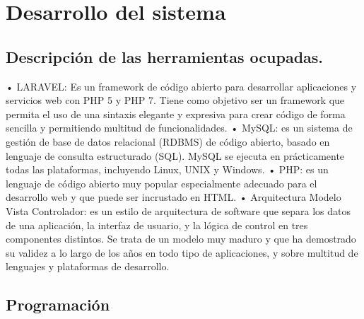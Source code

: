 \section{Desarrollo del sistema}
\subsection{Descripción de las herramientas ocupadas.}
•	LARAVEL: Es un framework de código abierto para desarrollar aplicaciones y servicios web con PHP 5 y PHP 7. Tiene como objetivo ser un framework que permita el uso de una sintaxis elegante y expresiva para crear código de forma sencilla y permitiendo multitud de funcionalidades.
•	MySQL: es un sistema de gestión de base de datos relacional (RDBMS) de código abierto, basado en lenguaje de consulta estructurado (SQL). MySQL se ejecuta en prácticamente todas las plataformas, incluyendo Linux, UNIX y Windows.
•	PHP: es un lenguaje de código abierto muy popular especialmente adecuado para el desarrollo web y que puede ser incrustado en HTML.
•	Arquitectura Modelo Vista Controlador: es un estilo de arquitectura de software que separa los datos de una aplicación, la interfaz de usuario, y la lógica de control en tres componentes distintos. Se trata de un modelo muy maduro y que ha demostrado su validez a lo largo de los años en todo tipo de aplicaciones, y sobre multitud de lenguajes y plataformas de desarrollo.


\subsection{Programación}